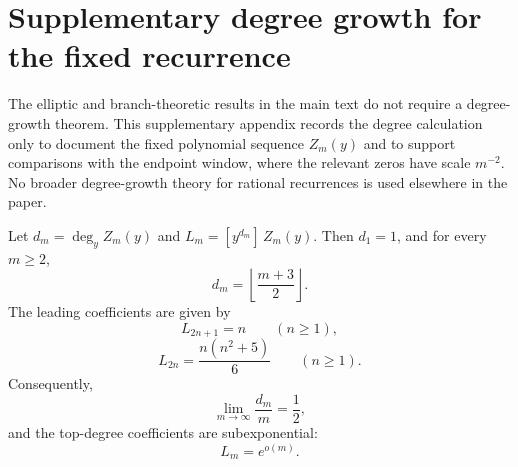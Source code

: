 \section{Supplementary degree growth for the fixed recurrence}\label{sec:degree-law}

The elliptic and branch-theoretic results in the main text do not require a degree-growth theorem.  This supplementary appendix records the degree calculation only to document the fixed polynomial sequence \(Z_m(y)\) and to support comparisons with the endpoint window, where the relevant zeros have scale \(m^{-2}\).  No broader degree-growth theory for rational recurrences is used elsewhere in the paper.

\begin{proposition}\label{prop:degree-law}
Let $d_m = \deg_y Z_m(y)$ and $L_m = [y^{d_m}]\,Z_m(y)$.
Then $d_1 = 1$, and for every $m \ge 2$,
\begin{equation}\label{eq:degree-formula}
d_m = \left\lfloor \frac{m+3}{2} \right\rfloor.
\end{equation}
The leading coefficients are given by
\begin{equation}\label{eq:leading-odd}
L_{2n+1} = n \qquad (n \ge 1),
\end{equation}
\begin{equation}\label{eq:leading-even}
L_{2n} = \frac{n(n^2 + 5)}{6} \qquad (n \ge 1).
\end{equation}
Consequently,
\begin{equation}\label{eq:half-filling}
\lim_{m \to \infty} \frac{d_m}{m} = \frac{1}{2},
\end{equation}
and the top-degree coefficients are subexponential:
\[
L_m = e^{o(m)}.
\]
\end{proposition}

